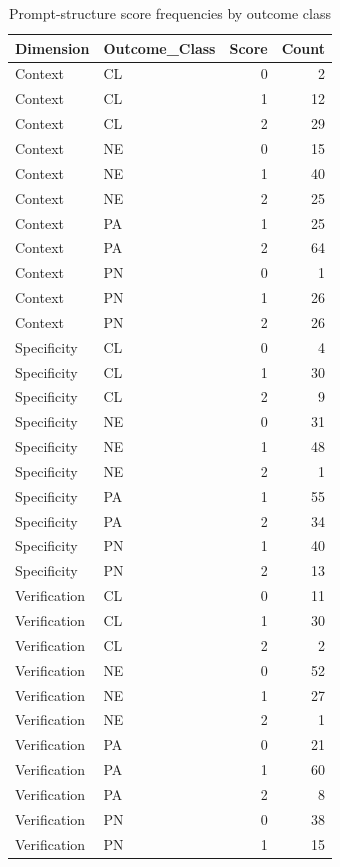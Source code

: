 \begin{table}
\caption{Prompt-structure score frequencies by outcome class}
\label{tab:code-frequencies}
\begin{tabular}{llrr}
\toprule
Dimension & Outcome_Class & Score & Count \\
\midrule
Context & CL & 0 & 2 \\
Context & CL & 1 & 12 \\
Context & CL & 2 & 29 \\
Context & NE & 0 & 15 \\
Context & NE & 1 & 40 \\
Context & NE & 2 & 25 \\
Context & PA & 1 & 25 \\
Context & PA & 2 & 64 \\
Context & PN & 0 & 1 \\
Context & PN & 1 & 26 \\
Context & PN & 2 & 26 \\
Specificity & CL & 0 & 4 \\
Specificity & CL & 1 & 30 \\
Specificity & CL & 2 & 9 \\
Specificity & NE & 0 & 31 \\
Specificity & NE & 1 & 48 \\
Specificity & NE & 2 & 1 \\
Specificity & PA & 1 & 55 \\
Specificity & PA & 2 & 34 \\
Specificity & PN & 1 & 40 \\
Specificity & PN & 2 & 13 \\
Verification & CL & 0 & 11 \\
Verification & CL & 1 & 30 \\
Verification & CL & 2 & 2 \\
Verification & NE & 0 & 52 \\
Verification & NE & 1 & 27 \\
Verification & NE & 2 & 1 \\
Verification & PA & 0 & 21 \\
Verification & PA & 1 & 60 \\
Verification & PA & 2 & 8 \\
Verification & PN & 0 & 38 \\
Verification & PN & 1 & 15 \\
\bottomrule
\end{tabular}
\end{table}
